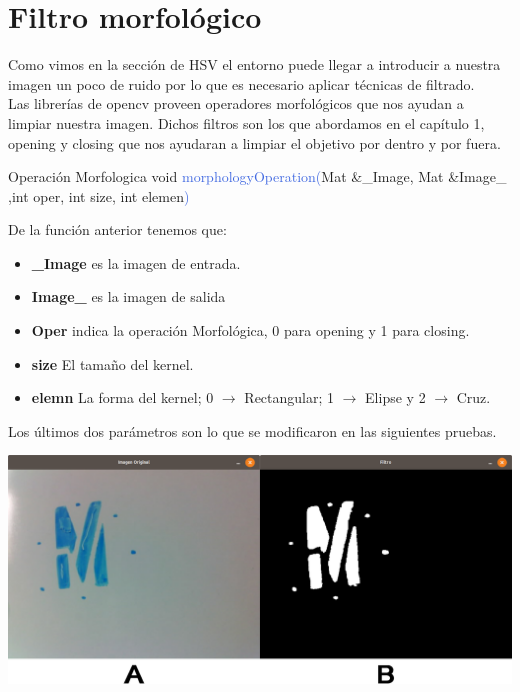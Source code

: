 \section{Filtro morfológico}
Como vimos en la sección de HSV el entorno puede llegar a introducir a nuestra
imagen un poco de ruido por lo que es necesario aplicar técnicas de filtrado.\\
Las librerías de opencv proveen operadores morfológicos que nos ayudan a limpiar
nuestra imagen.
Dichos filtros son los que abordamos en el capítulo 1, opening y closing que nos ayudaran
a limpiar el objetivo por dentro y por fuera.
\begin{example}[label={ex:serie}]{Operación Morfologica}
	\textcolor{Mulberry}{void} \textcolor{RoyalBlue}{morphologyOperation(}\textcolor{BurntOrange}{Mat}
	\textcolor{Mulberry}{\&}\textcolor{Bittersweet}{\_Image}, \textcolor{BurntOrange}{Mat} \textcolor{Mulberry}{\&}\textcolor{Bittersweet}{Image\_}
	,\textcolor{Mulberry}{int} \textcolor{Bittersweet}{oper}, \textcolor{Mulberry}{int} \textcolor{Bittersweet}{size},
	\textcolor{Mulberry}{int} \textcolor{Bittersweet}{elemen}\textcolor{RoyalBlue}{)}
\end{example}
De la función anterior tenemos que:
\begin{itemize}
    \item \textbf{\_Image} es la imagen de entrada.
    \item \textbf{Image\_} es la imagen de salida
    \item \textbf{Oper} indica la operación Morfológica, 0 para opening y 1 para closing.
    \item \textbf{size} El tamaño del kernel.
    \item \textbf{elemn} La forma del kernel; 0 $\rightarrow$ Rectangular; 1 $\rightarrow$ Elipse y
          2 $\rightarrow$ Cruz.
\end{itemize}
Los últimos dos parámetros son lo que se modificaron en las siguientes pruebas.
\begin{center}
	\includegraphics[width=0.7 \textwidth]{Contenido/Cuerpo/Capitulo4/Fig16.eps}
	\label{Fig9}
\end{center}
